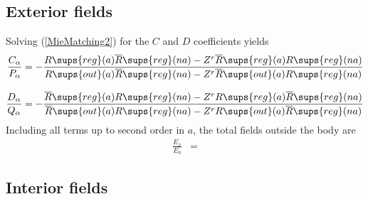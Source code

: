 \documentclass[letterpaper]{article}
\newcommand{\RBar}{\overline{R}}
\begin{document}
\subsection{Exterior fields}

Solving (\ref{MieMatching2}) for the $C$ and $D$ coefficients
yields 
\begin{align*}
\frac{C_\alpha}{P_\alpha}
&=-\frac{     R\sups{reg}(a) \RBar\sups{reg}(na) - 
          Z^r \RBar\sups{reg}(a) R\sups{reg}(na)  
        }
        {     R\sups{out}(a) \RBar\sups{reg}(na) - 
          Z^r \RBar\sups{out}(a) R\sups{reg}(na)
        }
\\[8pt]
\frac{D_\alpha}{Q_\alpha}
&=-\frac{     \RBar\sups{reg}(a) R\sups{reg}(na) -
          Z^r     R\sups{reg}(a) \RBar\sups{reg}(na)
        }
        {  \RBar\sups{out}(a) R\sups{reg}(na) -
          Z^r  R\sups{out}(a) \RBar\sups{reg}(na)
        }
\end{align*}
Including all terms up to second order in $a$, the total fields
outside the body are
\begin{align*}
 \frac{E_x}{E_0} &=
\end{align*}

\subsection{Interior fields}
\end{document}
